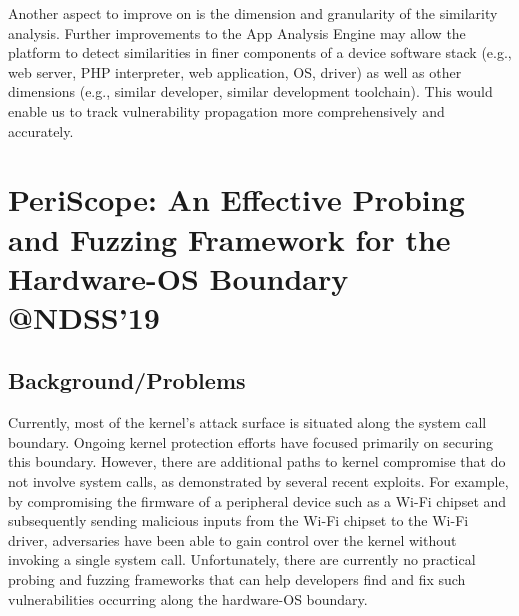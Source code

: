 Another aspect to improve on is the dimension and granularity of the similarity analysis. Further improvements to the App Analysis Engine may allow the platform to detect similarities in finer components of a device software stack (e.g., web server, PHP interpreter, web application, OS, driver) as well as other dimensions (e.g., similar developer, similar development toolchain). This would enable us to track vulnerability propagation more comprehensively and accurately. 
\newpage
\section{PeriScope: An Effective Probing and Fuzzing Framework for the Hardware-OS Boundary \\@NDSS'19}
\subsection{Background/Problems}
Currently, most of the kernel’s attack surface is situated along the system call boundary. Ongoing kernel protection efforts have focused primarily on securing this boundary.  However, there are additional paths to kernel compromise that do not involve system calls, as demonstrated by several recent exploits. For example, by compromising the firmware of a peripheral device such as a Wi-Fi chipset and subsequently sending malicious inputs from the Wi-Fi chipset to the Wi-Fi driver, adversaries have been able to gain control over the kernel without invoking a single system call. Unfortunately, there are currently no practical probing and fuzzing frameworks that can help developers find and fix such vulnerabilities occurring along the hardware-OS boundary.
